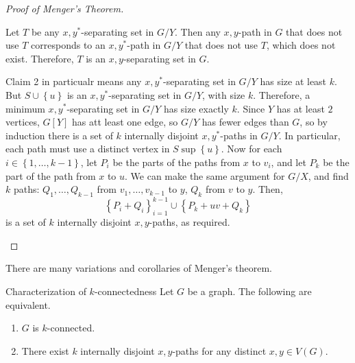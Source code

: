 \documentclass[co342]{subfiles}
\begin{document}
\begin{proof}[Proof of Menger's Theorem]
\begin{itemize}
\begin{itemize}
                        \begin{subproof}
                            Let $T$ be any $x,y^{*}$-separating set in $G /Y$. Then any $x,y$-path in $G$ that does not use $T$ corresponds to an $x,y^{*}$-path in $G /Y$ that does not use $T$, which does not exist. Therefore, $T$ is an $x,y$-separating set in $G$. 
                        \end{subproof}
                \end{itemize} 
                Claim 2 in particualr means any $x,y^{*}$-separating set in $G /Y$ has size at least $k$. But $S\cup \left\lbrace u \right\rbrace$ is an $x,y^{*}$-separating set in $G /Y$, with size $k$. Therefore, a minimum $x,y^{*}$-separating set in $G /Y$ has size exactly $k$. Since $Y$ has at least $2$ vertices, $G\left[ Y \right]$ has att least one edge, so $G /Y$ has fewer edges than $G$, so by induction there is a set of $k$ internally disjoint $x,y^{*}$-paths in $G /Y$. In particular, each path must use a distinct vertex in $S\sup \left\lbrace u \right\rbrace$. Now for each $i\in\left\lbrace 1,\ldots,k-1 \right\rbrace$, let $P_i$ be the parts of the paths from $x$ to $v_i$, and let $P_k$ be the part of the path from $x$ to $u$. We can make the same argument for $G /X$, and find $k$ paths: $Q_1,\ldots,Q_{k-1}$ from $v_1,\ldots,v_{k-1}$ to $y$, $Q_k$ from $v$ to $y$. Then,
                \begin{equation*}
                    \left\lbrace P_i+Q_i \right\rbrace^{k-1}_{i=1}\cup \left\lbrace P_k+uv+Q_k \right\rbrace
                \end{equation*}
                is a set of $k$ internally disjoint $x,y$-paths, as required. \qqedsym
        \end{itemize} 
    \end{proof}

    \np There are many variations and corollaries of Menger's theorem.

    \begin{cor}{Characterization of $k$-connectedness}
        Let $G$ be a graph. The following are equivalent.
        \begin{enumerate}
            \item $G$ is $k$-connected.
            \item There exist $k$ internally disjoint $x,y$-paths for any distinct $x,y\in V\left( G \right)$.
        \end{enumerate}
    \end{cor}	
\end{document}
